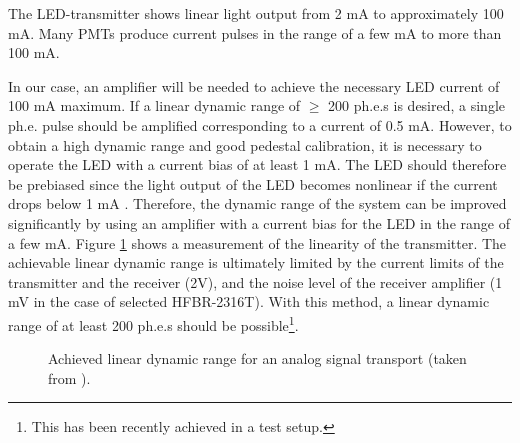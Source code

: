 
\medskip The LED-transmitter shows linear light output from 2 mA to
approximately 100 mA. Many PMTs produce current pulses in the
range of a few mA to more than 100 mA.

In our case, an amplifier will be needed to achieve the necessary LED
current of 100 mA maximum. If a linear dynamic range of $\geq $ 200 ph.e.s
is desired, a single ph.e. pulse should be amplified
corresponding 
to a current of 0.5 mA. However, to obtain a high dynamic range and
good pedestal calibration, it is necessary to operate the LED with a current
bias of at least 1 mA. The LED should therefore be prebiased since the light
output of the LED becomes nonlinear if the current drops below 1 mA \cite{karle:96}. 
Therefore, the dynamic range of the system can be improved
significantly by using an amplifier with a current bias for the LED in the
range of a few mA. Figure \ref{fig-linearity} shows a measurement of the
linearity of the transmitter. The achievable linear dynamic range is
ultimately limited by the current limits of the transmitter and the receiver
(2V), and the noise level of the receiver amplifier (1 mV in the case of
selected HFBR-2316T). With this method, a linear dynamic range of at least
200 ph.e.s should be possible\footnote{This has been recently achieved in a test
setup.}.

\begin{figure}[htb]
\begin{center}
\caption{\label{fig-linearity}
Achieved linear dynamic range
for an analog signal transport (taken from \protect\cite{karle:96}).}
\end{center}
\end{figure}


